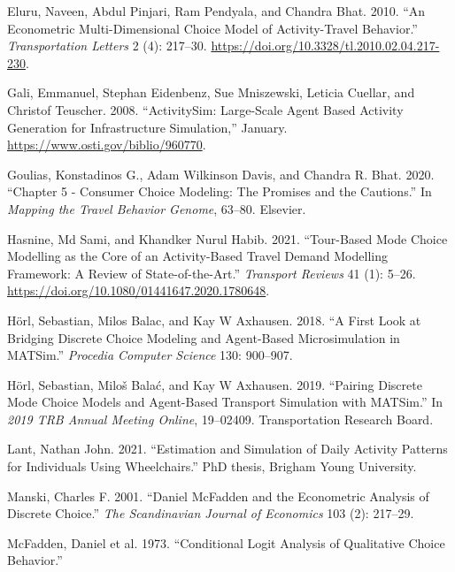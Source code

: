 \documentclass[12pt, oneside, openright]{byuthesis}
\newlength{\cslhangindent}
\newlength{\cslentryspacingunit} %
\newenvironment{CSLReferences}[2] %
 {%
  \setlength{\parindent}{0pt}
  \ifodd #1
  \let\oldpar\par
  \def\par{\hangindent=\cslhangindent\oldpar}
  \fi
  \setlength{\parskip}{#2\cslentryspacingunit}
 }%
 {}
\begin{document}
\begin{CSLReferences}{1}{0}
\leavevmode{}%
Eluru, Naveen, Abdul Pinjari, Ram Pendyala, and Chandra Bhat. 2010. {``An Econometric Multi-Dimensional Choice Model of Activity-Travel Behavior.''} \emph{Transportation Letters} 2 (4): 217--30. \url{https://doi.org/10.3328/tl.2010.02.04.217-230}.

\leavevmode{}%
Gali, Emmanuel, Stephan Eidenbenz, Sue Mniszewski, Leticia Cuellar, and Christof Teuscher. 2008. {``ActivitySim: Large-Scale Agent Based Activity Generation for Infrastructure Simulation,''} January. \url{https://www.osti.gov/biblio/960770}.

\leavevmode{}%
Goulias, Konstadinos G., Adam Wilkinson Davis, and Chandra R. Bhat. 2020. {``Chapter 5 - Consumer Choice Modeling: The Promises and the Cautions.''} In \emph{Mapping the Travel Behavior Genome}, 63--80. Elsevier.

\leavevmode{}%
Hasnine, Md Sami, and Khandker Nurul Habib. 2021. {``Tour-Based Mode Choice Modelling as the Core of an Activity-Based Travel Demand Modelling Framework: A Review of State-of-the-Art.''} \emph{Transport Reviews} 41 (1): 5--26. \url{https://doi.org/10.1080/01441647.2020.1780648}.

\leavevmode{}%
Hörl, Sebastian, Milos Balac, and Kay W Axhausen. 2018. {``A First Look at Bridging Discrete Choice Modeling and Agent-Based Microsimulation in MATSim.''} \emph{Procedia Computer Science} 130: 900--907.

\leavevmode{}%
Hörl, Sebastian, Miloš Balać, and Kay W Axhausen. 2019. {``Pairing Discrete Mode Choice Models and Agent-Based Transport Simulation with MATSim.''} In \emph{2019 TRB Annual Meeting Online}, 19--02409. Transportation Research Board.

\leavevmode{}%
Lant, Nathan John. 2021. {``Estimation and Simulation of Daily Activity Patterns for Individuals Using Wheelchairs.''} PhD thesis, Brigham Young University.

\leavevmode{}%
Manski, Charles F. 2001. {``Daniel McFadden and the Econometric Analysis of Discrete Choice.''} \emph{The Scandinavian Journal of Economics} 103 (2): 217--29.

\leavevmode{}%
McFadden, Daniel et al. 1973. {``Conditional Logit Analysis of Qualitative Choice Behavior.''}


\end{CSLReferences}
\end{document}
